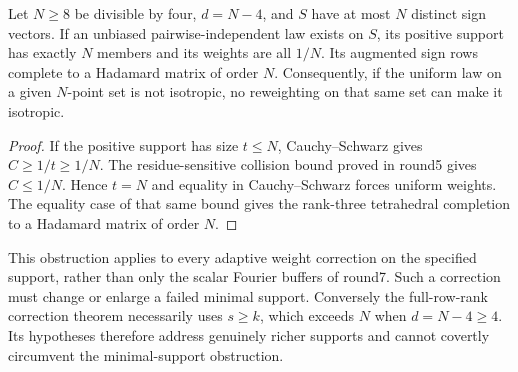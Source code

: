 \begin{theorem}
Let $N\ge8$ be divisible by four, $d=N-4$, and $S$ have at most $N$
distinct sign vectors. If an unbiased pairwise-independent law exists
on $S$, its positive support has exactly $N$ members and its weights
are all $1/N$. Its augmented sign rows complete to a Hadamard matrix
of order $N$.
Consequently, if the uniform law on a given $N$-point set is not
isotropic, no reweighting on that same set can make it isotropic.
\end{theorem}
\begin{proof}
If the positive support has size $t\le N$, Cauchy--Schwarz gives
$C\ge1/t\ge1/N$. The residue-sensitive collision bound proved in
round5 gives $C\le1/N$. Hence $t=N$ and equality in Cauchy--Schwarz
forces uniform weights. The equality case of that same bound gives
the rank-three tetrahedral completion to a Hadamard matrix of order
$N$.
\end{proof}
This obstruction applies to every adaptive weight correction on the
specified support, rather than only the scalar Fourier buffers of
round7. Such a correction must change or enlarge a failed minimal
support. Conversely the full-row-rank correction theorem necessarily
uses $s\ge k$, which exceeds $N$ when $d=N-4\ge4$. Its hypotheses
therefore address genuinely richer supports and cannot covertly
circumvent the minimal-support obstruction.

